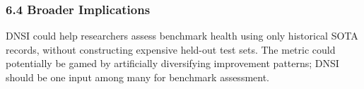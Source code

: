 \subsubsection{6.4 Broader Implications}

DNSI could help researchers assess benchmark health using only historical SOTA records, without constructing expensive held-out test sets. The metric could potentially be gamed by artificially diversifying improvement patterns; DNSI should be one input among many for benchmark assessment.
